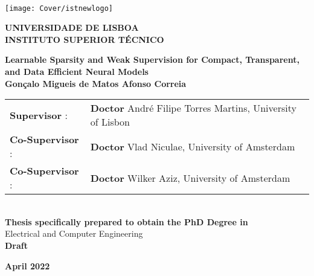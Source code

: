 \setcounter{page}{1} 


\thispagestyle{empty}
\begin{flushleft} ~\\ \vspace{-12mm} \hspace{-12mm}  \texttt{[image: Cover/istnewlogo]} 
 
\centering
\LARGE \textbf{UNIVERSIDADE DE LISBOA \\ INSTITUTO SUPERIOR TÉCNICO}
\vspace{30mm}

 \vspace{5mm}
 
\centering
\LARGE \textbf{Learnable Sparsity and Weak Supervision for Compact, Transparent, and Data Efficient Neural Models}
\\ \vspace{25mm}  %
\Large \textbf{Gonçalo Migueis de Matos Afonso Correia} \\
\vspace{4cm}

\begin{minipage}{\textwidth}
\begin{tabularx}{\textwidth}{ l @{ } l }
\large \textbf{Supervisor} : & \textbf{Doctor} André Filipe Torres Martins, University of Lisbon\\
 \large \textbf{Co-Supervisor} :  & \textbf{Doctor} Vlad Niculae, University of Amsterdam\\
 \large \textbf{Co-Supervisor} :  & \textbf{Doctor} Wilker Aziz, University of Amsterdam\\
\end{tabularx}

\end{minipage}
%
\\ \vspace{20mm}
\centering
\large \textbf{Thesis specifically prepared to obtain the PhD Degree in}\\
\large Electrical and Computer Engineering\\
\vspace{18mm}
\Large \textbf{Draft}
 
\vspace{15mm}

\large \textbf{April 2022} \\
\let\thepage\relax
\end{flushleft}
\pagebreak
